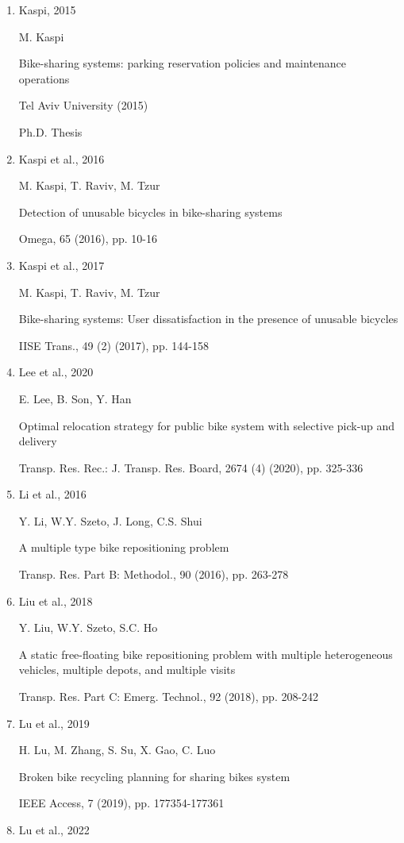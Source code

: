 \documentclass[
  english,
]{article}
\begin{document}
\begin{otherlanguage}{english}
\begin{enumerate}
  Simul. Model Pract. Theory, 115 (2022), Article 102422
\item
  Kaspi, 2015

  M. Kaspi

  Bike-sharing systems: parking reservation policies and maintenance operations

  Tel Aviv University (2015)

  Ph.D. Thesis
\item
  Kaspi et al., 2016

  M. Kaspi, T. Raviv, M. Tzur

  Detection of unusable bicycles in bike-sharing systems

  Omega, 65 (2016), pp. 10-16
\item
  Kaspi et al., 2017

  M. Kaspi, T. Raviv, M. Tzur

  Bike-sharing systems: User dissatisfaction in the presence of unusable bicycles

  IISE Trans., 49 (2) (2017), pp. 144-158
\item
  Lee et al., 2020

  E. Lee, B. Son, Y. Han

  Optimal relocation strategy for public bike system with selective pick-up and delivery

  Transp. Res. Rec.: J. Transp. Res. Board, 2674 (4) (2020), pp. 325-336
\item
  Li et al., 2016

  Y. Li, W.Y. Szeto, J. Long, C.S. Shui

  A multiple type bike repositioning problem

  Transp. Res. Part B: Methodol., 90 (2016), pp. 263-278
\item
  Liu et al., 2018

  Y. Liu, W.Y. Szeto, S.C. Ho

  A static free-floating bike repositioning problem with multiple heterogeneous vehicles, multiple
  depots, and multiple visits

  Transp. Res. Part C: Emerg. Technol., 92 (2018), pp. 208-242
\item
  Lu et al., 2019

  H. Lu, M. Zhang, S. Su, X. Gao, C. Luo

  Broken bike recycling planning for sharing bikes system

  IEEE Access, 7 (2019), pp. 177354-177361
\item
  Lu et al., 2022


\end{enumerate}
\end{otherlanguage}
\end{document}
